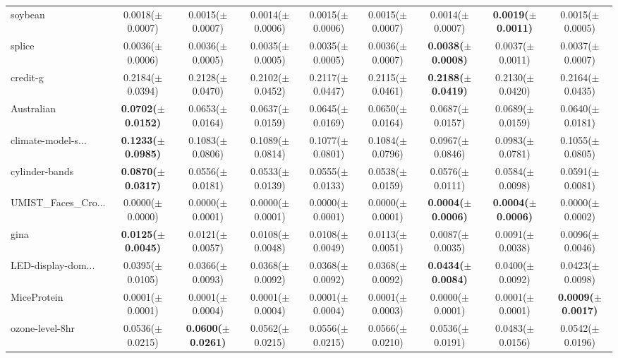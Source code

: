 \begin{longtable}{lcccccccc}
soybean & 0.0018($\pm$0.0007) & 0.0015($\pm$0.0007) & 0.0014($\pm$0.0006) & 0.0015($\pm$0.0006) & 0.0015($\pm$0.0007) & 0.0014($\pm$0.0007) & \textbf{0.0019($\pm$0.0011)} & 0.0015($\pm$0.0005) \\
splice & 0.0036($\pm$0.0006) & 0.0036($\pm$0.0005) & 0.0035($\pm$0.0005) & 0.0035($\pm$0.0005) & 0.0036($\pm$0.0007) & \textbf{0.0038($\pm$0.0008)} & 0.0037($\pm$0.0011) & 0.0037($\pm$0.0007) \\
credit-g & 0.2184($\pm$0.0394) & 0.2128($\pm$0.0470) & 0.2102($\pm$0.0452) & 0.2117($\pm$0.0447) & 0.2115($\pm$0.0461) & \textbf{0.2188($\pm$0.0419)} & 0.2130($\pm$0.0420) & 0.2164($\pm$0.0435) \\
Australian & \textbf{0.0702($\pm$0.0152)} & 0.0653($\pm$0.0164) & 0.0637($\pm$0.0159) & 0.0645($\pm$0.0169) & 0.0650($\pm$0.0164) & 0.0687($\pm$0.0157) & 0.0689($\pm$0.0159) & 0.0640($\pm$0.0181) \\
climate-model-s... & \textbf{0.1233($\pm$0.0985)} & 0.1083($\pm$0.0806) & 0.1089($\pm$0.0814) & 0.1077($\pm$0.0801) & 0.1084($\pm$0.0796) & 0.0967($\pm$0.0846) & 0.0983($\pm$0.0781) & 0.1055($\pm$0.0805) \\
cylinder-bands & \textbf{0.0870($\pm$0.0317)} & 0.0556($\pm$0.0181) & 0.0533($\pm$0.0139) & 0.0555($\pm$0.0133) & 0.0538($\pm$0.0159) & 0.0576($\pm$0.0111) & 0.0584($\pm$0.0098) & 0.0591($\pm$0.0081) \\
UMIST\_Faces\_Cro... & 0.0000($\pm$0.0000) & 0.0000($\pm$0.0001) & 0.0000($\pm$0.0001) & 0.0000($\pm$0.0001) & 0.0000($\pm$0.0001) & \textbf{0.0004($\pm$0.0006)} & \textbf{0.0004($\pm$0.0006)} & 0.0000($\pm$0.0002) \\
gina & \textbf{0.0125($\pm$0.0045)} & 0.0121($\pm$0.0057) & 0.0108($\pm$0.0048) & 0.0108($\pm$0.0049) & 0.0113($\pm$0.0051) & 0.0087($\pm$0.0035) & 0.0091($\pm$0.0038) & 0.0096($\pm$0.0046) \\
LED-display-dom... & 0.0395($\pm$0.0105) & 0.0366($\pm$0.0093) & 0.0368($\pm$0.0092) & 0.0368($\pm$0.0092) & 0.0368($\pm$0.0092) & \textbf{0.0434($\pm$0.0084)} & 0.0400($\pm$0.0092) & 0.0423($\pm$0.0098) \\
MiceProtein & 0.0001($\pm$0.0001) & 0.0001($\pm$0.0004) & 0.0001($\pm$0.0004) & 0.0001($\pm$0.0004) & 0.0001($\pm$0.0003) & 0.0000($\pm$0.0001) & 0.0001($\pm$0.0001) & \textbf{0.0009($\pm$0.0017)} \\
ozone-level-8hr & 0.0536($\pm$0.0215) & \textbf{0.0600($\pm$0.0261)} & 0.0562($\pm$0.0215) & 0.0556($\pm$0.0215) & 0.0566($\pm$0.0210) & 0.0536($\pm$0.0191) & 0.0483($\pm$0.0156) & 0.0542($\pm$0.0196) \\

\end{longtable}
